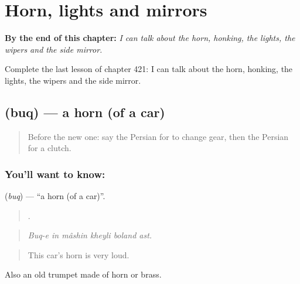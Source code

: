 
\chapter{Horn, lights and mirrors}
\label{ch:fa-horn-lights-and-mirrors}

\begin{chapteropening}
\textbf{By the end of this chapter:} \emph{I can talk about the horn, honking, the lights, the wipers and the side mirror.}

Complete the last lesson of chapter 421: I can talk about the horn, honking, the lights, the wipers and the side mirror.
\end{chapteropening}

\section[\texorpdfstring{\fa{بوق} (buq)}{بوق (buq)}]{ (buq) — a horn (of a car)}

\label{lesson:FA-C421-buq}



\begin{quote}
Before the new one: say the Persian for to change gear, then the Persian for a clutch.
\end{quote}

\subsection*{You'll want to know: }
\textbf{} (\emph{buq}) — \textquotedblleft{}a horn (of a car)\textquotedblright{}.

\begin{quote}
     .
\end{quote}

\begin{quote}
\emph{Buq-e in mâshin kheyli boland ast.}
\end{quote}

\begin{quote}
This car's horn is very loud.
\end{quote}

Also an old trumpet made of horn or brass.

